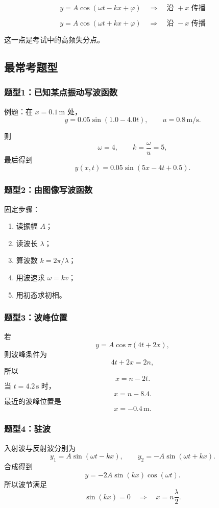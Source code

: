 \documentclass[12pt,a4paper]{article}
\begin{document}
\[
y = A\cos(\omega t-kx+\varphi)\quad \Rightarrow \quad \text{沿 } +x \text{ 传播}
\]

\[
y = A\cos(\omega t+kx+\varphi)\quad \Rightarrow \quad \text{沿 } -x \text{ 传播}
\]

这一点是考试中的高频失分点。

\subsection{最常考题型}

\subsubsection*{题型1：已知某点振动写波函数}

例题：在 $x=0.1\,\mathrm{m}$ 处，
\[
y=0.05\sin(1.0-4.0t),\qquad u=0.8\,\mathrm{m/s}.
\]

则
\[
\omega = 4,\qquad k=\frac{\omega}{u}=5,
\]
最后得到
\[
y(x,t)=0.05\sin(5x-4t+0.5).
\]

\subsubsection*{题型2：由图像写波函数}

固定步骤：

\begin{enumerate}
  \item 读振幅 $A$；
  \item 读波长 $\lambda$；
  \item 算波数 $k=2\pi/\lambda$；
  \item 用波速求 $\omega=kv$；
  \item 用初态求初相。
\end{enumerate}

\subsubsection*{题型3：波峰位置}

若
\[
y=A\cos\pi(4t+2x),
\]
则波峰条件为
\[
4t+2x=2n,
\]
所以
\[
x=n-2t.
\]
当 $t=4.2\,\mathrm{s}$ 时，
\[
x=n-8.4.
\]
最近的波峰位置是
\[
x=-0.4\,\mathrm{m}.
\]

\subsubsection*{题型4：驻波}

入射波与反射波分别为
\[
y_1=A\sin(\omega t-kx),\qquad
y_2=-A\sin(\omega t+kx).
\]
合成得到
\[
y=-2A\sin(kx)\cos(\omega t).
\]
所以波节满足
\[
\sin(kx)=0 \quad \Rightarrow \quad x=n\frac{\lambda}{2}.
\]
\end{document}
